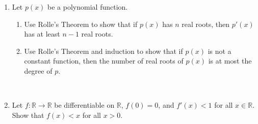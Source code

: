 \documentclass[12pt]{amsart}
\newcommand{\R}{\mathbb{R}}
\begin{document}
\begin{enumerate}
\

\item Let $p(x)$ be a polynomial function.
\begin{enumerate}
\item Use Rolle's Theorem to show that if $p(x)$ has $n$ real roots, then $p'(x)$ has at least $n-1$ real roots.
\item Use Rolle's Theorem and induction to show that if $p(x)$ is not a constant function, then the number of real roots of $p(x)$ is at most the degree of $p$.
\end{enumerate}

\

\item Let $f:\R\to\R$ be differentiable  on $\R$, $f(0)=0$, and $f'(x)<1$ for all $x\in \R$. Show that $f(x)<x$ for all $x>0$.

\





\end{enumerate}
\end{document}
